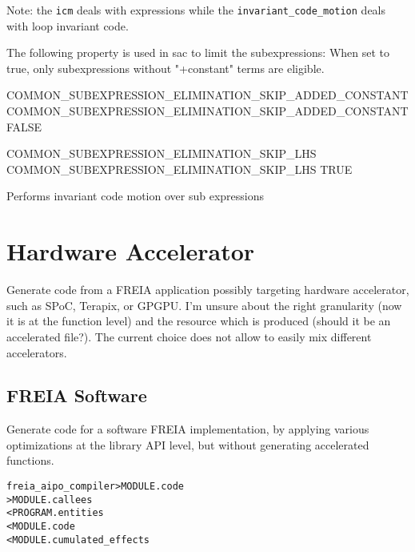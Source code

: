 \documentclass[a4paper]{report}
\newenvironment{PipsMake}{\begin{alltt}}{\end{alltt}}
\newenvironment{PipsPass}[1]{\label{pass:#1}}{}
\begin{document}
Note: the \verb/icm/ deals with expressions while
the \verb/invariant_code_motion/ deals with loop invariant code.

The following property is used in sac to limit the subexpressions:
When set to true, only subexpressions without "+constant" terms are eligible.
\begin{PipsProp}{COMMON_SUBEXPRESSION_ELIMINATION_SKIP_ADDED_CONSTANT}
COMMON_SUBEXPRESSION_ELIMINATION_SKIP_ADDED_CONSTANT FALSE
\end{PipsProp}

\begin{PipsProp}{COMMON_SUBEXPRESSION_ELIMINATION_SKIP_LHS}
COMMON_SUBEXPRESSION_ELIMINATION_SKIP_LHS TRUE
\end{PipsProp}

\begin{PipsPass}{icm}
Performs invariant code motion over sub expressions
\end{PipsPass}




\section{Hardware Accelerator}
\label{hardware-accelerator}

Generate code from a FREIA application possibly targeting hardware
accelerator, such as SPoC, Terapix, or GPGPU.
I'm unsure about the right granularity (now it is at the function
level) and the resource which is produced (should it be an accelerated
file?). The current choice does not allow to easily mix different
accelerators.

\subsection{FREIA Software}
\label{hwac-freia-software}

Generate code for a software FREIA implementation, by applying various
optimizations at the library API level, but without generating accelerated
functions.

\begin{PipsMake}
freia_aipo_compiler   > MODULE.code
                      > MODULE.callees
        < PROGRAM.entities
        < MODULE.code
        < MODULE.cumulated_effects
\end{PipsMake}
\end{document}
